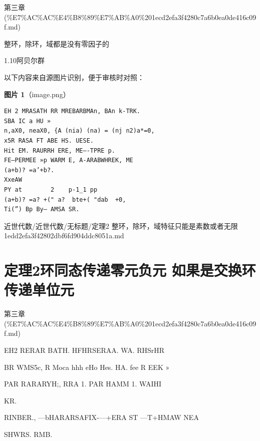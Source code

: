 \begin{note}[来源上级主题]

第三章 (\%E7\%AC\%AC\%E4\%B8\%89\%E7\%AB\%A0\%201ecd2efa3f4280c7a6b0ea0de416c09f.md)

\end{note}

\begin{theorem}[定理2 整环，除环，域特征只能是素数或者无限]

整环，除环，域都是没有零因子的

1.10阿贝尔群

\end{theorem}

\begin{note}
以下内容来自源图片识别，便于审核时对照：

\textbf{图片 1}（image.png）
\begin{Verbatim}[fontsize=\small]
EH 2 MRASATH RR MREBARBMAn, BAn k-TRK.
SBA IC a HU »
n,aX0, neaX0, {A (nia) (na) = (nj n2)a*=0,
x5R RASA FT ABE HS. UESE.
Hit EM. RAURRH ERE, ME—-TPRE p.
FE—PERMEE »p WARM E, A-ARABWHREK, ME
(a+b)? =a’+b?.
XxeAW
PY at        2    p-1_1 pp
(a+b)? =a? +(" a?  bte+( "dab  +0,
Ti(”) Bp By— AMSA SR.
\end{Verbatim}

\end{note}

\begin{note}[来源路径]

近世代数/近世代数/无标题/定理2 整环，除环，域特征只能是素数或者无限 1edd2efa3f42802dbf6fd904ddc8051a.md

\end{note}

\section*{定理2环同态传递零元负元 如果是交换环传递单位元}

\begin{note}[来源上级主题]

第三章 (\%E7\%AC\%AC\%E4\%B8\%89\%E7\%AB\%A0\%201ecd2efa3f4280c7a6b0ea0de416c09f.md)

\end{note}

\begin{theorem}

EH2 RERAR BATH. HFHRSERAA. WA. RHSrHR

BR WMS5c, R Moca hhh eHo Hes. HA. fee R EEK »

PAR RARARYH;, RRA 1. PAR HAMM 1. WAIHI

KR.

RINBER., —bHARARSAFIX-—+ERA ST —T+HMAW NEA

SHWRS. RMB.

\end{theorem}

